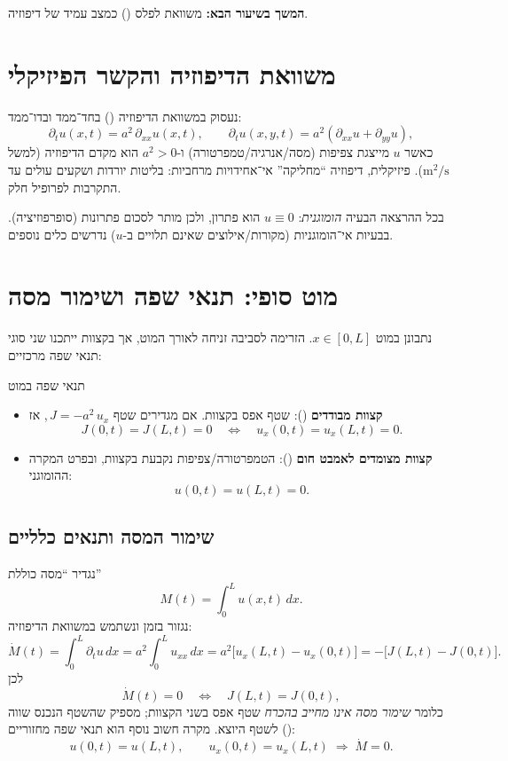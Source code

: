 \textbf{המשך בשיעור הבא:} משוואת לפלס () כמצב עמיד של דיפוזיה.





\section{משוואת הדיפוזיה והקשר הפיזיקלי}
נעסוק במשוואת הדיפוזיה () בחד־ממד ובדו־ממד:
\[
\partial_t u(x,t)=a^2\,\partial_{xx}u(x,t),
\qquad
\partial_t u(x,y,t)=a^2\left(\partial_{xx}u+\partial_{yy}u\right),
\]
כאשר \(u\) מייצגת צפיפות (מסה/אנרגיה/טמפרטורה) ו-\(a^2>0\) הוא מקדם הדיפוזיה (למשל \(\mathrm{m}^2/\mathrm{s}\)).
פיזיקלית, דיפוזיה ``מחליקה'' אי־אחידויות מרחביות: בליטות יורדות ושקעים עולים עד התקרבות לפרופיל חלק.

\begin{notebox}
בכל ההרצאה הבעיה \emph{הומוגנית}: \(u\equiv 0\) הוא פתרון, ולכן מותר לסכום פתרונות (סופרפוזיציה).
בבעיות אי־הומוגניות (מקורות/אילוצים שאינם תלויים ב-\(u\)) נדרשים כלים נוספים.
\end{notebox}

\section{מוט סופי: תנאי שפה ושימור מסה}
נתבונן במוט \(x\in[0,L]\). הזרימה לסביבה זניחה לאורך המוט, אך בקצוות ייתכנו שני סוגי תנאי שפה מרכזיים:

\begin{definitionbox}{תנאי שפה במוט}
\begin{itemize}
\item \textbf{קצוות מבודדים} (): שטף אפס בקצוות.
אם מגדירים שטף \(\,J=-a^2\,u_x\), אז
\[
J(0,t)=J(L,t)=0
\quad\Longleftrightarrow\quad
u_x(0,t)=u_x(L,t)=0.
\]
\item \textbf{קצוות מצומדים לאמבט חום} (): הטמפרטורה/צפיפות נקבעת בקצוות,
ובפרט המקרה ההומוגני:
\[
u(0,t)=u(L,t)=0.
\]
\end{itemize}
\end{definitionbox}

\subsection{שימור המסה ותנאים כלליים}
נגדיר ``מסה כוללת''
\[
M(t)=\int_0^L u(x,t)\,dx.
\]
נגזור בזמן ונשתמש במשוואת הדיפוזיה:
\[
\dot M(t)=\int_0^L \partial_t u\,dx
=a^2\int_0^L u_{xx}\,dx
=a^2\bigl[u_x(L,t)-u_x(0,t)\bigr]
= -\bigl[J(L,t)-J(0,t)\bigr].
\]
לכן
\[
\dot M(t)=0
\quad\Longleftrightarrow\quad
J(L,t)=J(0,t),
\]
כלומר \emph{שימור מסה אינו מחייב בהכרח} שטף אפס בשני הקצוות; מספיק שהשטף הנכנס שווה לשטף היוצא.
מקרה חשוב נוסף הוא תנאי שפה מחזוריים ():
\[
u(0,t)=u(L,t),\qquad u_x(0,t)=u_x(L,t)
\;\Rightarrow\; \dot M=0.
\]

